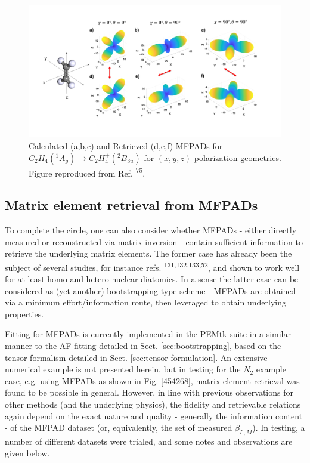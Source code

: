 \documentclass[10pt]{article}
\begin{document}
\begin{figure}[H]
\begin{center}
\includegraphics[width=1.00\columnwidth]{figures/D2h1/D2h1}
\caption{{Calculated (a,b,c) and Retrieved (d,e,f) MFPADs for \(C_2 H_4(^1A_g) \rightarrow C_2H_4^+(^2B_{3u})\)
for \((x,y,z)\) polarization geometries. Figure reproduced from
Ref. \protect\textsuperscript{\hyperref[csl:75]{75}}.
{\label{584598}}%
}}
\end{center}
\end{figure}

\subsection{Matrix element retrieval from MFPADs\label{sec:recon-from-MFPADs}}

To complete the circle, one can also consider whether MFPADs - either directly measured or reconstructed via matrix inversion - contain sufficient information to retrieve the underlying matrix elements.  The former case has already been the subject of several studies, for instance refs. \textsuperscript{\hyperref[csl:131]{131},\hyperref[csl:132]{132},\hyperref[csl:133]{133},\hyperref[csl:52]{52}}, and shown to work well for at least homo and hetero nuclear diatomics. In a sense the latter case can be considered as (yet another) bootstrapping-type scheme - MFPADs are obtained via a minimum effort/information route, then leveraged to obtain underlying properties. 

Fitting for MFPADs is currently implemented in the PEMtk suite in a similar manner to the AF fitting detailed in Sect. \ref{sec:bootstrapping}, based on the tensor formalism detailed in Sect. \ref{sec:tensor-formulation}. An extensive numerical example is not presented herein, but in testing for the $N_{2}$ example case, e.g. using MFPADs as shown in Fig. \ref{454268}, matrix element retrieval was found to be possible in general. However, in line with previous observations for other methods (and the underlying physics), the fidelity and retrievable relations again depend on the exact nature and quality - generally the information content - of the MFPAD dataset (or, equivalently, the set of measured $\beta_{L,M}$). In testing, a number of different datasets were trialed, and some notes and observations are given below.
\end{document}
